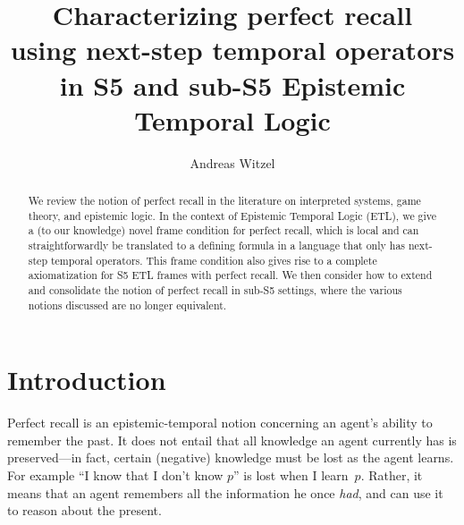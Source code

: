 \documentclass{article}
\author{Andreas Witzel}
\title{Characterizing perfect recall\\using next-step temporal operators\\in S5 and sub-S5 Epistemic Temporal Logic}
\newcounter{#1}
\begin{document}
\maketitle

\begin{abstract}
  We review the notion of perfect recall
  in the literature on interpreted systems, game theory, and epistemic logic.
  In the context of Epistemic Temporal Logic (ETL),
  we give a (to our knowledge) novel frame condition for perfect recall,
  which is local and can straightforwardly be translated to a defining formula
  in a language that only has next-step temporal operators.
  This frame condition also gives rise to a complete axiomatization for S5 ETL frames with perfect recall.
  We then consider how to extend and consolidate the notion of perfect recall in sub-S5 settings,
  where the various notions discussed are no longer equivalent.
\end{abstract}

\section{Introduction}
\label{sec:introduction}

Perfect recall is an epistemic-temporal notion concerning an agent's ability to remember the past.
It does not entail that all knowledge an agent currently has is preserved---in fact, certain (negative) knowledge must be lost as the agent learns.
For example ``I know that I don't know $p$'' is lost when I learn~$p$.
Rather, it means that an agent remembers all the information he once \emph{had},
and can use it to reason about the present.
\end{document}
